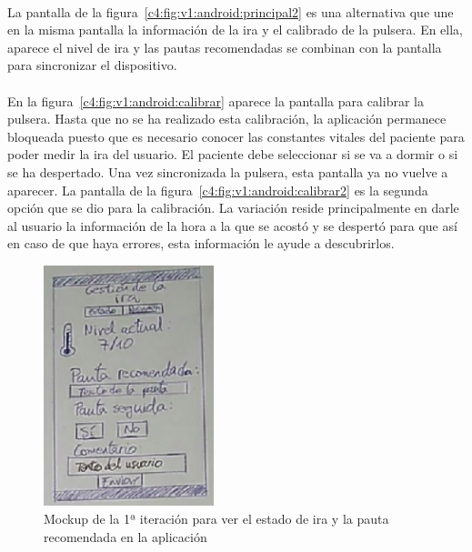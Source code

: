 \paragraph{}
La pantalla de la figura~\ref{c4:fig:v1:android:principal2} es una alternativa que une en la misma pantalla la información de la ira y el calibrado de la pulsera. En ella, aparece el nivel de ira y las pautas recomendadas se combinan con la pantalla para sincronizar el dispositivo.

\paragraph{}
En la figura~\ref{c4:fig:v1:android:calibrar} aparece la pantalla para calibrar la pulsera. Hasta que no se ha realizado esta calibración, la aplicación permanece bloqueada puesto que es necesario conocer las constantes vitales del paciente para poder medir la ira del usuario. El paciente debe seleccionar si se va a dormir o si se ha despertado. Una vez sincronizada la pulsera, esta pantalla ya no vuelve a aparecer. La pantalla de la figura~\ref{c4:fig:v1:android:calibrar2} es la segunda opción que se dio para la calibración. La variación reside principalmente en darle al usuario la información de la hora a la que se acostó y se despertó para que así en caso de que haya errores, esta información le ayude a descubrirlos.

\begin{figure}[H]
    \centering
    \includegraphics[width=0.36\linewidth, height=7cm]{Imagenes/04DescProblema/mockups/v1/android/01-principal.png}
    \caption[Mockup de la 1ª iteración para ver el estado de ira y la pauta recomendada en la aplicacón]{Mockup de la 1ª iteración para ver el estado de ira y la pauta recomendada en la aplicación}
    \label{c4:fig:v1:android:principal}
\end{figure}


